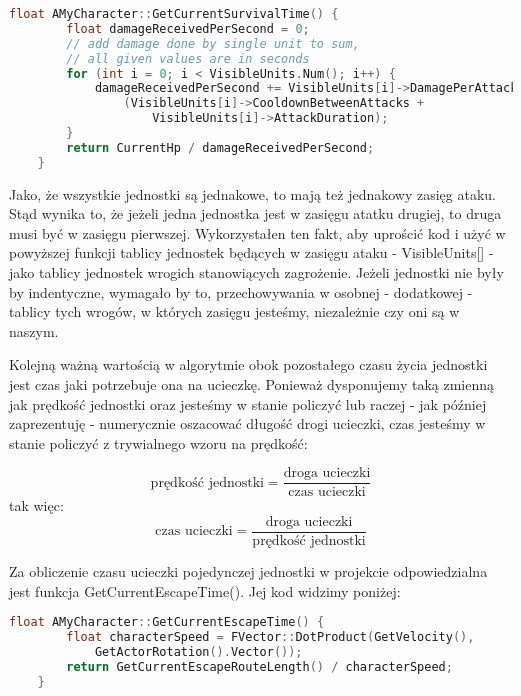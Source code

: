 \documentclass[12pt]{report}
\begin{document}
\begin{lstlisting}[language=C++, backgroundcolor=\color{black!5}, basicstyle=\footnotesize, caption=Funkcja GetCurrentSurvivalTime w klasie \texttt{AMyCharacter.cpp}.]
    float AMyCharacter::GetCurrentSurvivalTime() {
		float damageReceivedPerSecond = 0;
		// add damage done by single unit to sum, 
		// all given values are in seconds
		for (int i = 0; i < VisibleUnits.Num(); i++) { 
			damageReceivedPerSecond += VisibleUnits[i]->DamagePerAttack /
				(VisibleUnits[i]->CooldownBetweenAttacks + 
				    VisibleUnits[i]->AttackDuration);
		}
		return CurrentHp / damageReceivedPerSecond;
	}
\end{lstlisting}

Jako, że wszystkie jednostki są jednakowe, to mają też jednakowy zasięg ataku. Stąd wynika to, że jeżeli jedna jednostka jest w zasięgu atatku drugiej, to druga musi być w zasięgu pierwszej. Wykorzystałen ten fakt, aby uprościć kod i użyć w powyższej funkcji tablicy jednostek będących w zasięgu ataku - VisibleUnits[] - jako tablicy jednostek wrogich stanowiących zagrożenie. Jeżeli jednostki nie były by indentyczne, wymagało by to, przechowywania w osobnej - dodatkowej - tablicy tych wrogów, w których zasięgu jesteśmy, niezależnie czy oni są w naszym.

Kolejną ważną wartością w algorytmie obok pozostałego czasu życia jednostki jest czas jaki potrzebuje ona na ucieczkę. Ponieważ dysponujemy taką zmienną jak prędkość jednostki oraz jesteśmy w stanie policzyć lub raczej - jak później zaprezentuję - numerycznie oszacować długość drogi ucieczki, czas jesteśmy w stanie policzyć z trywialnego wzoru na prędkość:

\[ \text{prędkość jednostki} =  \dfrac{\text{droga ucieczki}}{\text{czas ucieczki}}  \]
tak więc:
\[ {\text{czas ucieczki}} =  \dfrac{\text{droga ucieczki}}{\text{prędkość jednostki}}  \]


Za obliczenie czasu ucieczki pojedynczej jednostki w projekcie odpowiedzialna jest funkcja GetCurrentEscapeTime(). Jej kod widzimy poniżej: 

\begin{lstlisting}[language=C++, backgroundcolor=\color{black!5}, basicstyle=\footnotesize, caption=Funkcja GetCurrentEscapeTime w klasie \texttt{AMyCharacter.cpp}.]
	float AMyCharacter::GetCurrentEscapeTime() {
		float characterSpeed = FVector::DotProduct(GetVelocity(), 
		    GetActorRotation().Vector());
		return GetCurrentEscapeRouteLength() / characterSpeed;
	}
\end{lstlisting}
\end{document}

